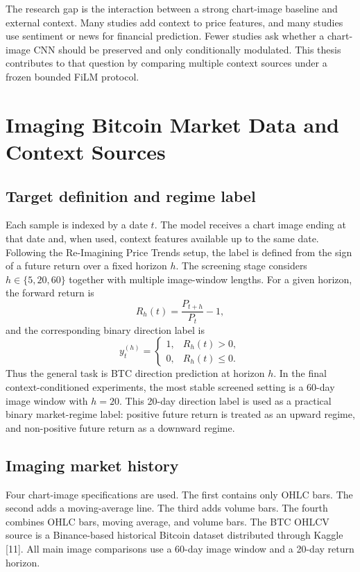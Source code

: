 \documentclass[14pt,a4paper]{extarticle}
\begin{document}
The research gap is the interaction between a strong chart-image baseline and external context. Many studies add context to price features, and many studies use sentiment or news for financial prediction. Fewer studies ask whether a chart-image CNN should be preserved and only conditionally modulated. This thesis contributes to that question by comparing multiple context sources under a frozen bounded FiLM protocol.

\clearpage

\section{Imaging Bitcoin Market Data and Context Sources}

\subsection{Target definition and regime label}

Each sample is indexed by a date $t$. The model receives a chart image ending at that date and, when used, context features available up to the same date. Following the Re-Imagining Price Trends setup, the label is defined from the sign of a future return over a fixed horizon $h$. The screening stage considers $h \in \{5,20,60\}$ together with multiple image-window lengths. For a given horizon, the forward return is
\begin{equation}
R_h(t)=\frac{P_{t+h}}{P_t}-1,
\end{equation}
and the corresponding binary direction label is
\begin{equation}
y_t^{(h)}=\begin{cases}1,&R_h(t)>0,\\0,&R_h(t)\leq0.\end{cases}
\end{equation}
Thus the general task is BTC direction prediction at horizon $h$. In the final context-conditioned experiments, the most stable screened setting is a 60-day image window with $h=20$. This 20-day direction label is used as a practical binary market-regime label: positive future return is treated as an upward regime, and non-positive future return as a downward regime.

\subsection{Imaging market history}

Four chart-image specifications are used. The first contains only OHLC bars. The second adds a moving-average line. The third adds volume bars. The fourth combines OHLC bars, moving average, and volume bars. The BTC OHLCV source is a Binance-based historical Bitcoin dataset distributed through Kaggle [11]. All main image comparisons use a 60-day image window and a 20-day return horizon.
\end{document}
